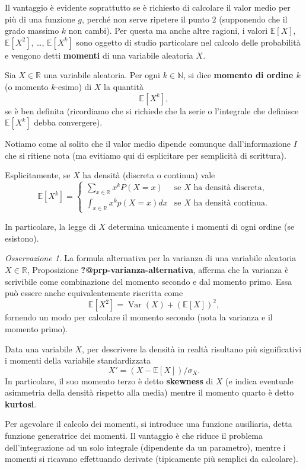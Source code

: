 \documentclass[
  italian,
  letterpaper,
]{book}
\newcommand{\bra}[1]{\left( #1 \right)}
\newcommand{\sqa}[1]{\left[ #1 \right]}
\newcommand{\R}{\mathbb{R}}
\newcommand{\N}{\mathbb{N}}
\newcommand{\E}[1]{\mathbb{E}\sqa{#1}}
\newcommand{\Var}[1]{\operatorname{Var}\bra{#1}}
\theoremstyle{definition}
\theoremstyle{remark}
\newtheorem*{remark}{Osservazione}
\begin{document}
Il vantaggio è evidente soprattutto se è richiesto di calcolare il valor
medio per più di una funzione \(g\), perché non serve ripetere il punto
\(2\) (supponendo che il grado massimo \(k\) non cambi). Per questa ma
anche altre ragioni, i valori \(\E{X}\), \(\E{X^2}\), \ldots,
\(\E{X^k}\) sono oggetto di studio particolare nel calcolo delle
probabilità e vengono detti \textbf{momenti} di una variabile aleatoria
\(X\).

Sia \(X \in \R\) una variabile aleatoria. Per ogni \(k \in \N\), si dice
\textbf{momento di ordine \(k\)} (o momento \(k\)-esimo) di \(X\) la
quantità \[\E {X^k},\] se è ben definita (ricordiamo che si richiede che
la serie o l'integrale che definisce \(\E{X^k}\) debba convergere).

Notiamo come al solito che il valor medio dipende comunque
dall'informazione \(I\) che si ritiene nota (ma evitiamo qui di
esplicitare per semplicità di scrittura).

Esplicitamente, se \(X\) ha densità (discreta o continua) vale
\[ \E{X^k} = \begin{cases} \sum_{x \in \R} x^k P(X=x) & \text{se $X$ ha densità discreta,}\\
\int_{x \in \R} x^k p(X=x)d x & \text{se $X$ ha densità continua.}
\end{cases}\]

In particolare, la legge di \(X\) determina unicamente i momenti di ogni
ordine (se esistono).

\begin{remark}
La formula alternativa per la varianza di una variabile aleatoria
\(X \in \R\), Proposizione \textbf{?@prp-varianza-alternativa}, afferma
che la varianza è scrivibile come combinazione del momento secondo e dal
momento primo. Essa può essere anche equivalentemente riscritta come
\[ \E{X^2} = \Var{X} + (\E{X})^2,\] fornendo un modo per calcolare il
momento secondo (nota la varianza e il momento primo).
\end{remark}

Data una variabile \(X\), per descrivere la densità in realtà risultano
più significativi i momenti della variabile standardizzata
\[ X'  = (X-\E{X})/\sigma_X.\] In particolare, il suo momento terzo è
detto \textbf{skewness} di \(X\) (e indica eventuale asimmetria della
densità rispetto alla media) mentre il momento quarto è detto
\textbf{kurtosi}.

Per agevolare il calcolo dei momenti, si introduce una funzione
ausiliaria, detta funzione generatrice dei momenti. Il vantaggio è che
riduce il problema dell'integrazione ad un solo integrale (dipendente da
un parametro), mentre i momenti si ricavano effettuando derivate
(tipicamente più semplici da calcolare).
\end{document}
